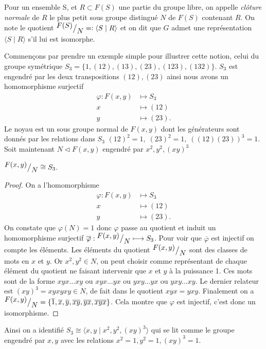 \documentclass[main.tex]{subfiles}
\begin{document}
	\begin{definition}
		Pour un ensemble S, et $R \subset F(S)$	une partie du groupe libre, on appelle \emph{clôture normale} de $R$ le plus petit sous groupe distingué $N$ de $F(S)$ contenant $R$. On note le quotient ${^{\textstyle F(S)}\big/_{\textstyle N}} =\vcentcolon \langle S \;|\; R \rangle$ et on dit que $G$ admet une représentation $\langle S \;|\; R \rangle$ s'il lui est isomorphe.
	\end{definition}

	Commençons par prendre un exemple simple pour illustrer cette notion, celui du groupe symétrique $S_{3} = \{1, (12), (13), (23), (123), (132)\}$. $S_{3}$ est engendré par les deux transpositions $(12), (23)$ ainsi nous avons un homomorphisme surjectif
	\begin{align*}
		\varphi : F(x,y) &\longmapsto S_3 \\
		x &\longmapsto (12) \\
		y &\longmapsto (23)
	.\end{align*}
	Le noyau est un sous groupe normal de $F(x,y)$ dont les générateurs sont donnés par les relations dans $S_{3}$ $(12)^2 = 1, \; (23)^2 = 1, \; ((12)(23))^3 = 1$. \\
	Soit maintenant $N \triangleleft F(x,y)$ engendré par $x^2,y^2,(xy)^3$
	\begin{prop}
		${^{\textstyle F(x,y)}\big/_{\textstyle N}} \cong S_3$.
	\end{prop}
	\begin{proof}
		On a l'homomorphisme
		\begin{align*}
			\varphi : F(x,y) &\longmapsto S_{3} \\
			x &\longmapsto (12) \\
			y &\longmapsto (23)
		.\end{align*}
		On constate que $\varphi(N) = 1$ donc $\varphi$ passe au quotient et induit un homomorphisme surjectif  $\overline{\varphi} : {^{\textstyle F(x,y)}\big/_{\textstyle N}} \longmapsto S_{3}$. Pour voir que $\overline{\varphi}$ est injectif on compte les éléments. Les éléments du quotient ${^{\textstyle F(x,y)}\big/_{\textstyle N}}$ sont des classes de mots en $x$ et $y$. Or $x^2,y^2 \in N$, on peut choisir comme représentant de chaque élément du quotient ne faisant intervenir que $x$ et $y$ à la puissance 1. Ces mots sont de la forme $xyx\ldots xy$ ou $xyx\ldots yx$ ou $yxy\ldots yx$ ou $yxy\ldots xy$. Le dernier relateur est $(xy)^3 = xyxyxy \in N$, de fait dans le quotient $xyx = yxy$. Finalement on a ${^{\textstyle F(x,y)}\big/_{\textstyle N}} = \{ \overline{1}, \overline{x}, \overline{y}, \overline{xy}, \overline{yx}, \overline{xyx}\}$. Cela montre que $\varphi$ est injectif, c'est donc un isomorphisme.
	\end{proof}
	Ainsi on a identifié $S_{3} \cong \langle x,y \;|\; x^{2},y^{2},(xy)^{3} \rangle$ qui se lit comme le groupe engendré par $x,y$ avec les relations $x^2 = 1, y^2 = 1, (xy)^3 = 1$.
\end{document}
